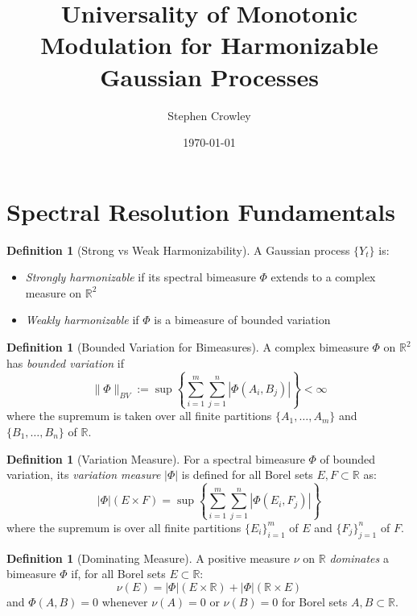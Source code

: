 \documentclass{article}
\title{Universality of Monotonic Modulation for Harmonizable Gaussian Processes}
\author{Stephen Crowley}
\date{\today}
\theoremstyle{plain}
\theoremstyle{definition}
\newtheorem{definition}[theorem]{Definition}
\begin{document}
\maketitle

\section{Spectral Resolution Fundamentals}

\begin{definition}[Strong vs Weak Harmonizability]
A Gaussian process $\{Y_t\}$ is:
\begin{itemize}
\item \emph{Strongly harmonizable} if its spectral bimeasure $\Phi$ extends to a complex measure on $\mathbb{R}^2$
\item \emph{Weakly harmonizable} if $\Phi$ is a bimeasure of bounded variation
\end{itemize}
\end{definition}

\begin{definition}[Bounded Variation for Bimeasures]
A complex bimeasure $\Phi$ on $\mathbb{R}^2$ has \emph{bounded variation} if
\begin{equation}
\|\Phi\|_{BV} := \sup\left\{\sum_{i=1}^m\sum_{j=1}^n |\Phi(A_i, B_j)| \right\} < \infty
\end{equation}
where the supremum is taken over all finite partitions $\{A_1, \ldots, A_m\}$ and $\{B_1, \ldots, B_n\}$ of $\mathbb{R}$.
\end{definition}

\begin{definition}[Variation Measure]
For a spectral bimeasure $\Phi$ of bounded variation, its \emph{variation measure} $|\Phi|$ is defined for all Borel sets $E, F \subset \mathbb{R}$ as:
\begin{equation}
|\Phi|(E \times F) = \sup\left\{\sum_{i=1}^m\sum_{j=1}^n |\Phi(E_i, F_j)| \right\}
\end{equation}
where the supremum is over all finite partitions $\{E_i\}_{i=1}^m$ of $E$ and $\{F_j\}_{j=1}^n$ of $F$.
\end{definition}

\begin{definition}[Dominating Measure]
A positive measure $\nu$ on $\mathbb{R}$ \emph{dominates} a bimeasure $\Phi$ if, for all Borel sets $E \subset \mathbb{R}$:
\begin{equation}
\nu(E) = |\Phi|(E \times \mathbb{R}) + |\Phi|(\mathbb{R} \times E)
\end{equation}
and $\Phi(A, B) = 0$ whenever $\nu(A) = 0$ or $\nu(B) = 0$ for Borel sets $A, B \subset \mathbb{R}$.
\end{definition}
\end{document}
